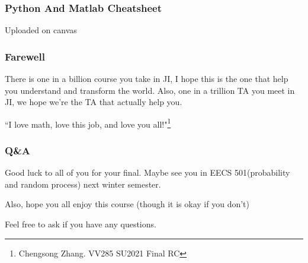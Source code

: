 \documentclass{beamer}
\begin{document}
\begin{frame}
    \frametitle{Python And Matlab Cheatsheet}

    Uploaded on canvas

\end{frame}

\begin{frame}
    \frametitle{Farewell}

    There is one in a billion course you take in JI, I hope this is the one that help you understand and transform the world. Also, one in a trillion TA you meet in JI, we hope we're the TA that actually help you.\par
    \vspace{0.3cm}
    ``I love math, love this job, and love you all!"\footnote{Chengsong Zhang. VV285 SU2021 Final RC}\par
    
    

\end{frame}
\begin{frame}
    \frametitle{Q\&A}
    Good luck to all of you for your ﬁnal. Maybe see you in EECS 501(probability and random process) next winter semester.\par
    \vspace{0.3cm}
    Also, hope you all enjoy this course (though it is okay if you don't)\par
    Feel free to ask if you have any questions.\par
    
    
    
\end{frame}
\end{document}
